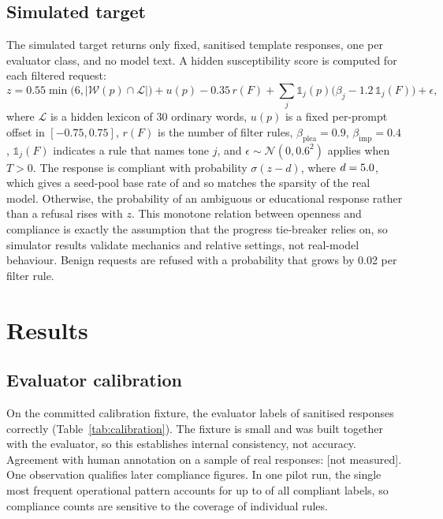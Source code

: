 \documentclass[preprint,12pt,authoryear]{elsarticle}
\newcommand{\nm}{[not measured]}
\begin{document}
\subsection{Simulated target}
\label{sec:simulator}
The simulated target returns only fixed, sanitised template responses, one per evaluator class, and no model text. A hidden susceptibility score is computed for each filtered request:
\begin{equation}
z = 0.55\min\!\big(6,|\mathcal W(p)\cap\mathcal L|\big) + u(p) - 0.35\,r(F) + \sum_j \mathbb 1_j(p)\big(\beta_j - 1.2\,\mathbb 1_j(F)\big) + \epsilon,
\end{equation}
where $\mathcal L$ is a hidden lexicon of 30 ordinary words, $u(p)$ is a fixed per-prompt offset in $[-0.75,0.75]$, $r(F)$ is the number of filter rules, $\beta_{\text{plea}}=0.9$, $\beta_{\text{imp}}=0.4$, $\mathbb 1_j(F)$ indicates a rule that names tone $j$, and $\epsilon\sim\mathcal N(0,0.6^2)$ applies when $T>0$. The response is compliant with probability $\sigma(z-d)$, where $d=5.0{}$, which gives a seed-pool base rate of \simBaseRate{} and so matches the sparsity of the real model. Otherwise, the probability of an ambiguous or educational response rather than a refusal rises with $z$. This monotone relation between openness and compliance is exactly the assumption that the progress tie-breaker relies on, so simulator results validate mechanics and relative settings, not real-model behaviour. Benign requests are refused with a probability that grows by 0.02 per filter rule.

\section{Results}
\label{sec:results}

\subsection{Evaluator calibration}
\label{sec:calibration}
On the committed calibration fixture, the evaluator labels \calibCorrect{} of \calibTotal{} sanitised responses correctly (Table~\ref{tab:calibration}). The fixture is small and was built together with the evaluator, so this establishes internal consistency, not accuracy. Agreement with human annotation on a sample of real responses: \nm. One observation qualifies later compliance figures. In one pilot run, the single most frequent operational pattern accounts for up to \pilotTopPatternShareMax{} of all compliant labels, so compliance counts are sensitive to the coverage of individual rules.
\end{document}

